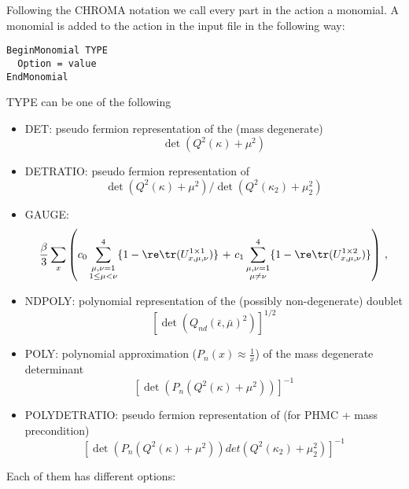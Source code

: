 Following the CHROMA notation we call every part in the action a
monomial. A monomial is added to the action in the input file in the
following way:
\begin{verbatim}
BeginMonomial TYPE
  Option = value
EndMonomial
\end{verbatim}
{\ttfamily TYPE} can be one of the following
\begin{itemize}
\item {\ttfamily DET}: pseudo fermion representation of the (mass degenerate)\\
  \[
  \det(Q^2(\kappa) + \mu^2)
  \]
\item {\ttfamily DETRATIO}: pseudo fermion representation of\\
  \[
  \det(Q^2(\kappa) + \mu^2)/\det(Q^2(\kappa_2) + \mu_2^2)
  \]
\item {\ttfamily GAUGE}:\\
  \[
  \frac{\beta}{3}\sum_x\left(  c_0\sum_{\substack{
        \mu,\nu=1\\1\leq\mu<\nu}}^4\{1-\re\tr(U^{1\times1}_{x,\mu,\nu})\}\Bigr. 
    \Bigl.\ +\ 
    c_1\sum_{\substack{\mu,\nu=1\\\mu\neq\nu}}^4\{1
    -\re\tr(U^{1\times2}_{x,\mu,\nu})\}\right)\,  ,
  \]
\item {\ttfamily NDPOLY}: polynomial representation of the (possibly
  non-degenerate) doublet\\
  \[
  [\det(Q_{nd}(\bar\epsilon, \bar\mu)^2)]^{1/2}
  \]
\item {\ttfamily POLY}: polynomial approximation ($P_n(x) \approx \frac{1}{x}$) of the mass degenerate determinant\\
  \[
  \left[\det(P_{n}(Q^2(\kappa) + \mu^2))\right]^{-1}
  \]
\item {\ttfamily POLYDETRATIO}: pseudo fermion representation of (for PHMC + mass precondition)\\
  \[
  \left[\det(P_{n}(Q^2(\kappa) + \mu^2)) det(Q^2(\kappa_2) + \mu^2_2)\right]^{-1}
  \]
\end{itemize}
Each of them has different options:
